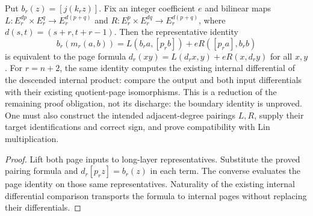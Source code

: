 \begin{proposition}
  \label{prop:h6-long-pairing-leibniz-criterion}
  \leanok
  Put $b_r(z)=[j(k_rz)]$. Fix an integer coefficient $e$ and bilinear maps
  $L:E_r^{dp}\times E_r^q\to E_r^{d(p+q)}$ and
  $R:E_r^p\times E_r^{dq}\to E_r^{d(p+q)}$, where
  $d(s,t)=(s+r,t+r-1)$. Then the representative identity
  \[
    b_r(m_r(a,b))=L(b_ra,[p_rb])+eR([p_ra],b_rb)
  \]
  is equivalent to the page formula
  $d_r(xy)=L(d_rx,y)+eR(x,d_ry)$ for all $x,y$.
  For $r=n+2$, the same identity computes the existing internal differential
  of the descended internal product: compare the output and both input
  differentials with their existing quotient-page isomorphisms.
  This is a reduction of the remaining proof obligation, not its discharge:
  the boundary identity is unproved. One must also construct the intended
  adjacent-degree pairings $L,R$, supply their target identifications and
  correct sign, and prove compatibility with Lin multiplication.
\end{proposition}
\begin{proof}
  Lift both page inputs to long-layer representatives. Substitute the proved
  pairing formula and $d_r[p_rz]=b_r(z)$ in each term. The converse evaluates
  the page identity on those same representatives.
  Naturality of the existing internal differential comparison transports
  the formula to internal pages without replacing their differentials.
  \leanok
\end{proof}

